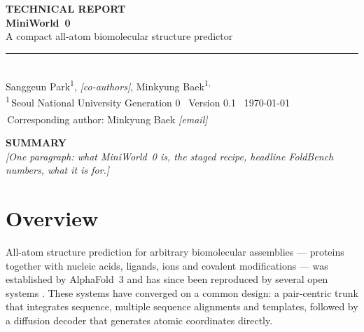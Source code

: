 \documentclass[11pt]{article}
\newcommand{\todo}[1]{{\color{draft}\itshape\small[#1]}}
\newcommand{\mw}{MiniWorld~0}
\newcommand{\mwdisplay}{\mbox{MiniWorld 0}}
\newcommand{\kicker}[1]{{\sffamily\footnotesize\bfseries\color{accent}\MakeUppercase{#1}}}
\begin{document}
\thispagestyle{fancy}

\begingroup
\raggedright
\kicker{Technical Report}\\[0.9em]
{\sffamily\bfseries\fontsize{27}{31}\selectfont \mwdisplay}\\[0.45em]
{\large\color{muted} A compact all-atom biomolecular structure predictor}\\[1.1em]
{\color{rule}\rule{\linewidth}{1.2pt}}\\[0.9em]
{\normalsize Sanggeun Park\textsuperscript{1},\;
\todo{co-authors},\;
Minkyung Baek\textsuperscript{1,\,\textdagger}}\\[0.5em]
{\footnotesize\color{muted}\textsuperscript{1}\,Seoul National University
\hfill Generation 0 \textperiodcentered\ Version 0.1 \textperiodcentered\ \today}\\[0.2em]
{\footnotesize\color{muted}\textsuperscript{\textdagger}\,Corresponding author:
Minkyung Baek \todo{email}}
\endgroup
\vspace{1.4em}

\begin{tcolorbox}[colback=accentsoft, colframe=accentsoft, boxrule=0pt,
  left=1.1em, right=1.1em, top=0.9em, bottom=0.9em, arc=2pt]
{\kicker{Summary}}\\[0.5em]
\todo{One paragraph: what \mw{} is, the staged recipe, headline FoldBench
numbers, what it is for.}
\end{tcolorbox}
\vspace{0.6em}

\section{Overview}
All-atom structure prediction for arbitrary biomolecular assemblies ---
proteins together with nucleic acids, ligands, ions and covalent modifications
--- was established by AlphaFold~3 \citep{af3} and has since been reproduced by
several open systems \citep{protenix, boltz1, chai1, opendde}. These systems
have converged on a common design: a pair-centric trunk that integrates
sequence, multiple sequence alignments and templates, followed by a diffusion
decoder that generates atomic coordinates directly.
\end{document}
